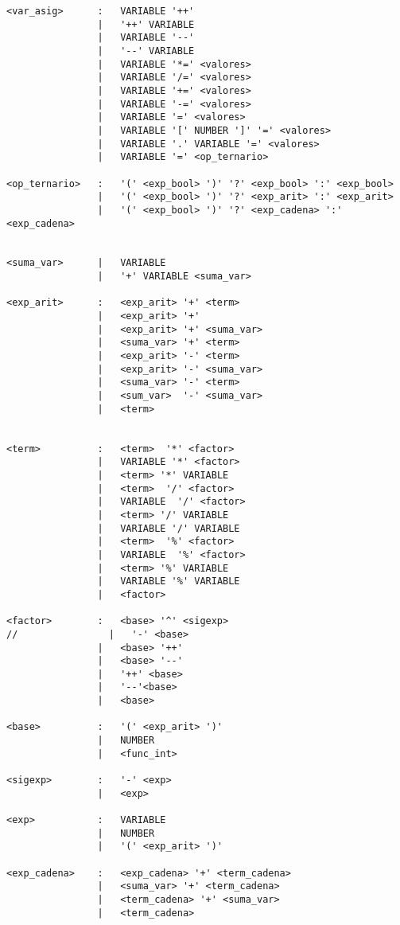 \begin{verbatim}
<var_asig>      :   VARIABLE '++'
                |   '++' VARIABLE
                |   VARIABLE '--'
                |   '--' VARIABLE
                |   VARIABLE '*=' <valores>
                |   VARIABLE '/=' <valores>
                |   VARIABLE '+=' <valores>
                |   VARIABLE '-=' <valores>
                |   VARIABLE '=' <valores>
                |   VARIABLE '[' NUMBER ']' '=' <valores>
                |   VARIABLE '.' VARIABLE '=' <valores>
                |   VARIABLE '=' <op_ternario>

<op_ternario>   :   '(' <exp_bool> ')' '?' <exp_bool> ':' <exp_bool>
                |   '(' <exp_bool> ')' '?' <exp_arit> ':' <exp_arit>
                |   '(' <exp_bool> ')' '?' <exp_cadena> ':' <exp_cadena>


<suma_var>      |   VARIABLE
                |   '+' VARIABLE <suma_var>

<exp_arit>      :   <exp_arit> '+' <term>
                |   <exp_arit> '+' 
                |   <exp_arit> '+' <suma_var>
                |   <suma_var> '+' <term>
                |   <exp_arit> '-' <term>
                |   <exp_arit> '-' <suma_var>
                |   <suma_var> '-' <term>
                |   <sum_var>  '-' <suma_var>
                |   <term>


<term>          :   <term>  '*' <factor>
                |   VARIABLE '*' <factor>
                |   <term> '*' VARIABLE
                |   <term>  '/' <factor>
                |   VARIABLE  '/' <factor>
                |   <term> '/' VARIABLE
                |   VARIABLE '/' VARIABLE
                |   <term>  '%' <factor>
                |   VARIABLE  '%' <factor>
                |   <term> '%' VARIABLE
                |   VARIABLE '%' VARIABLE
                |   <factor>

<factor>        :   <base> '^' <sigexp>
//                |   '-' <base> 
                |   <base> '++'
                |   <base> '--'
                |   '++' <base>
                |   '--'<base>
                |   <base>

<base>          :   '(' <exp_arit> ')'
                |   NUMBER
                |   <func_int>

<sigexp>        :   '-' <exp>
                |   <exp>

<exp>           :   VARIABLE
                |   NUMBER
                |   '(' <exp_arit> ')'

<exp_cadena>    :   <exp_cadena> '+' <term_cadena>
                |   <suma_var> '+' <term_cadena>
                |   <term_cadena> '+' <suma_var>
                |   <term_cadena> 


\end{verbatim}
